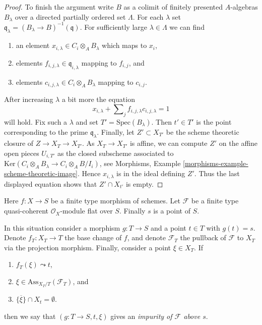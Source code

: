 \begin{proof}
\medskip\noindent
To finish the argument write $B$ as a colimit of finitely presented
$A$-algebras $B_\lambda$ over a directed partially ordered set $\Lambda$.
For each $\lambda$ set
$\mathfrak q_\lambda = (B_\lambda \to B)^{-1}(\mathfrak q)$.
For sufficiently large $\lambda \in \Lambda$ we can find
\begin{enumerate}
\item an element
$x_{i, \lambda} \in C_i \otimes_A B_\lambda$ which maps to $x_i$,
\item elements $f_{i, j, \lambda} \in \mathfrak q_{i, \lambda}$
mapping to $f_{i, j}$, and
\item elements $c_{i, j, \lambda} \in C_i \otimes_A B_\lambda$
mapping to $c_{i, j}$.
\end{enumerate}
After increasing $\lambda$ a bit more the equation
$$
x_{i, \lambda} + \sum\nolimits_j f_{i, j, \lambda}c_{i, j, \lambda} = 1
$$
will hold. Fix such a $\lambda$ and set $T' = \text{Spec}(B_\lambda)$.
Then $t' \in T'$ is the point corresponding to the prime $\mathfrak q_\lambda$.
Finally, let $Z' \subset X_{T'}$ be the scheme theoretic closure of
$Z \to X_T \to X_{T'}$. As $X_T \to X_{T'}$ is affine, we can compute $Z'$
on the affine open pieces $U_{i, T'}$ as the closed subscheme associated
to $\text{Ker}(C_i \otimes_A B_\lambda \to C_i \otimes_A B/I_i)$, see
Morphisms, Example \ref{morphisms-example-scheme-theoretic-image}.
Hence $x_{i, \lambda}$ is in the ideal defining $Z'$. Thus the last
displayed equation shows that $Z' \cap X_{t'}$ is empty.
\end{proof}

\begin{situation}
\label{situation-pre-pure}
Here $f : X \to S$ be a finite type morphism of schemes.
Let $\mathcal{F}$ be a finite type quasi-coherent $\mathcal{O}_X$-module
flat over $S$. Finally $s$ is a point of $S$.
\end{situation}

\noindent
In this situation consider a morphism $g : T \to S$ and a point $t \in T$
with $g(t) = s$. Denote $f_T : X_T \to T$ the base change of $f$, and
denote $\mathcal{F}_T$ the pullback of $\mathcal{F}$ to $X_T$ via the
projection morphism. Finally, consider a point $\xi \in X_T$. If
\begin{enumerate}
\item $f_T(\xi) \leadsto t$,
\item $\xi \in \text{Ass}_{X_T/T}(\mathcal{F}_T)$, and
\item $\overline{\{\xi\}} \cap X_t = \emptyset$.
\end{enumerate}
then we say that $(g : T \to S, t, \xi)$ gives an
{\it impurity of $\mathcal{F}$ above $s$}.

